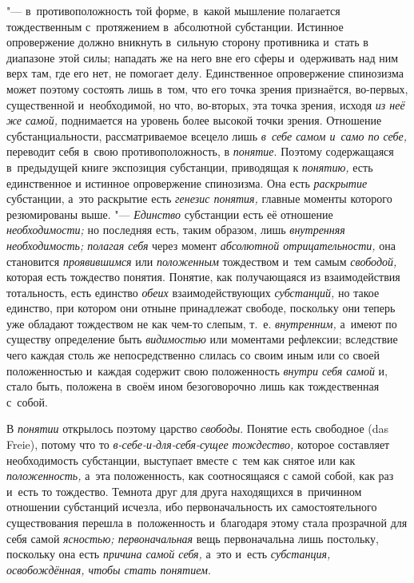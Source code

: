 "--- в~противоположность той форме, в~какой мышление полагается
тождественным с~протяжением в~абсолютной субстанции. Истинное опровержение
должно вникнуть в~сильную сторону противника и~стать в
диапазоне этой силы; нападать же на него вне его сферы и~одерживать над ним
верх там, где его нет, не помогает делу. Единственное опровержение
спинозизма может поэтому состоять лишь в~том, что его точка зрения
признаётся, во-первых, существенной и~необходимой, но что, во-вторых, эта
точка зрения, исходя {\em из неё же самой,} поднимается на уровень более
высокой точки зрения. Отношение субстанциальности, рассматриваемое всецело
лишь {\em в~себе самом и~само по себе,} переводит себя в~свою
противоположность, в {\em понятие}. Поэтому содержащаяся в~предыдущей книге
экспозиция субстанции, приводящая к {\em понятию,} есть единственное и
истинное опровержение спинозизма. Она есть {\em раскрытие} субстанции, а~это
раскрытие есть {\em генезис понятия,} главные моменты которого резюмированы
выше. "--- {\em Единство} субстанции есть её отношение {\em необходимости;}
но последняя есть, таким образом, лишь {\em внутренняя необходимость;
полагая себя} через момент {\em абсолютной отрицательности,} она
становится {\em проявившимся} или {\em положенным} тождеством и~тем самым
{\em свободой,} которая есть тождество понятия. Понятие, как получающаяся из
взаимодействия тотальность, есть единство {\em обеих} взаимодействующих
{\em субстанций,} но такое единство, при котором они отныне принадлежат
свободе, поскольку они теперь уже обладают тождеством не как чем-то слепым,
т.~е. {\em внутренним,} а~имеют по существу определение быть {\em видимостью}
или моментами рефлексии; вследствие чего каждая столь же непосредственно
слилась со своим иным или со своей положенностью и~каждая содержит свою
положенность {\em внутри себя самой} и, стало быть, положена в~своём ином
безоговорочно лишь как тождественная с~собой.

В {\em понятии} открылось поэтому царство {\em свободы}. Понятие есть
свободное (das Freie), потому что то {\em в-себе-и-для-себя-сущее тождество,}
которое составляет необходимость субстанции, выступает вместе с~тем как
снятое или как {\em положенность,} а~эта положенность, как соотносящаяся с
самой собой, как раз и~есть то тождество. Темнота друг для друга находящихся
в~причинном отношении субстанций исчезла, ибо первоначальность их
самостоятельного существования перешла в~положенность и~благодаря этому
стала прозрачной для себя самой {\em ясностью; первоначальная}
вещь
первоначальна лишь постольку, поскольку она есть {\em причина самой себя,}
а~это и~есть {\em субстанция, освобождённая, чтобы стать понятием}.

